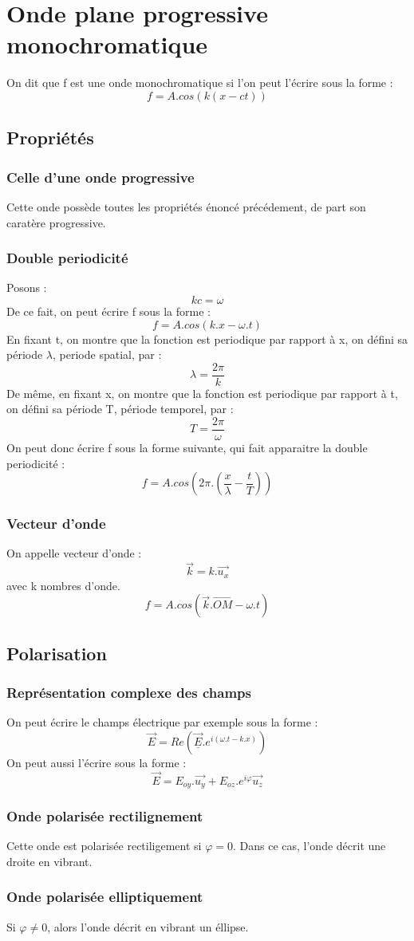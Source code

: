 \section{Onde plane progressive monochromatique}
\begin{de}
On dit que f est une onde monochromatique si l'on peut l'écrire sous la forme : 
$$f = A.cos(k(x-ct))$$
\end{de}
\subsection{Propriétés}
\subsubsection{Celle d'une onde progressive}
Cette onde possède toutes les propriétés énoncé précédement, de part son caratère progressive.
\subsubsection{Double periodicité}
Posons : 
$$kc = \omega$$
De ce fait, on peut écrire f sous la forme : 
$$f = A.cos(k.x-\omega.t)$$
En fixant t, on montre que la fonction est periodique par rapport à x, on défini sa période $\lambda$, periode spatial, par : 
$$\lambda = \dfrac{2\pi}{k}$$
De même, en fixant x, on montre que la fonction est periodique par rapport à t, on défini sa période T, période temporel, par : 
$$T = \dfrac{2\pi}{\omega}$$
On peut donc écrire f sous la forme suivante, qui fait apparaitre la double periodicité : 
$$f = A.cos(2\pi.(\dfrac{x}{\lambda} - \dfrac{t}{T}))$$
\subsubsection{Vecteur d'onde}
\begin{de}
On appelle vecteur d'onde :
$$\overrightarrow{k} = k.\overrightarrow{u_x}$$
avec k nombres d'onde.\\
$$f = A.cos(\overrightarrow{k}.\overrightarrow{OM}-\omega.t)$$
\end{de}
\subsection{Polarisation}
\subsubsection{Représentation complexe des champs}
On peut écrire le champs électrique par exemple sous la forme : 
$$\overrightarrow{E} = Re(\underline{\overrightarrow{E}}.e^{i(\omega.t-k.x)})$$
On peut aussi l'écrire sous la forme : 
$$\overrightarrow{E} = E_{oy}.\overrightarrow{u_y} + E_{oz}.e^{i\varphi}\overrightarrow{u_z}$$
\subsubsection{Onde polarisée rectilignement}
Cette onde est polarisée rectiligement si $\varphi=0$. Dans ce cas, l'onde décrit une droite en vibrant.
\subsubsection{Onde polarisée elliptiquement}
Si $\varphi \neq 0$, alors l'onde décrit en vibrant un éllipse. 
